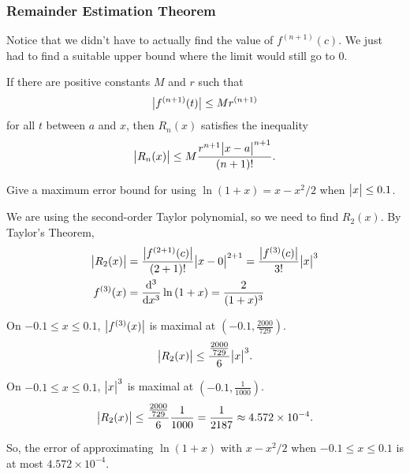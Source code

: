 \subsubsection{Remainder Estimation Theorem}
Notice that we didn't have to actually find the value of $f^{(n+1)}(c)$.
We just had to find a suitable upper bound where the limit would still go to 0.
\begin{theorem}
	If there are positive constants $M$ and $r$ such that
	\begin{equation*}
		\big\lvert f^{(n+1)}(t) \big\rvert \leq Mr^{(n+1)}
	\end{equation*}
	for all $t$ between $a$ and $x$, then $R_n(x)$ satisfies the inequality
	\begin{equation*}
		\big\lvert R_n(x) \big\rvert \leq M\frac{r^{n+1}\big\lvert x-a \big\rvert^{n+1}}{(n+1)!}.
	\end{equation*}
\end{theorem}

\begin{example}
	Give a maximum error bound for using $\ln{(1+x)} = x - x^2/2$ when $\big\lvert x \big\rvert \leq 0.1$.
\end{example}
\begin{answer}
	We are using the second-order Taylor polynomial, so we need to find $R_2(x)$.
	By Taylor's Theorem,
	\begin{align*}
		\big\lvert R_2(x) \big\rvert &= \frac{\big\lvert f^{(2+1)}(c) \big\rvert}{(2+1)!}\big\lvert x-0 \big\rvert^{2+1}  = \frac{\big\lvert f^{(3)}(c) \big\rvert}{3!}\big\lvert x \big\rvert^3\\
		f^{(3)}(x) &= \frac{\mathrm{d} ^3}{\mathrm{d} x^3}\ln{(1+x)} = \frac{2}{(1+x)^3} \\
	\end{align*}
	
	On $-0.1 \leq x \leq 0.1$, $\big\lvert f^{(3)}(x) \big\rvert$ is maximal at $(-0.1, \frac{2000}{729})$.
	\begin{equation*}
		\big\lvert R_2(x) \big\rvert \leq \frac{\frac{2000}{729}}{6}\big\lvert x \big\rvert^3.
	\end{equation*}
	
	On $-0.1 \leq x \leq 0.1$, $\big\lvert x \big\rvert^3$ is maximal at $(-0.1, \frac{1}{1000})$.
	\begin{equation*}
		\big\lvert R_2(x) \big\rvert \leq \frac{\frac{2000}{729}}{6}\frac{1}{1000} = \frac{1}{2187} \approx 4.572 \times 10^{-4}. 
	\end{equation*}
	
	So, the error of approximating $\ln{(1+x)}$ with $x-x^2/2$ when $-0.1 \leq x \leq 0.1$ is at most $4.572 \times 10^{-4}$.
\end{answer}